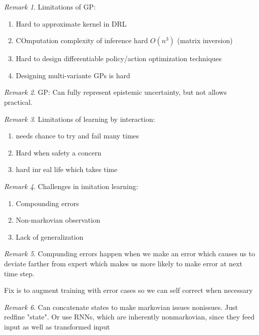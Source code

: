 \documentclass[11pt]{article}
\theoremstyle{remark}
\newtheorem{remark}{Remark}
\begin{document}
\begin{remark}
	Limitations of GP:
	\begin{enumerate}
		\item Hard to approximate kernel in DRL
		\item COmputation complexity of inference hard $O(n^3)$ (matrix inversion)
		\item Hard to design differentiable policy/action optimization techniques
		\item Designing multi-variante GPs is hard
	\end{enumerate}
\end{remark}

\begin{remark}
	GP: Can fully represent epistemic uncertainty, but not allows practical. 
\end{remark}

\begin{remark}
	Limitations of learning by interaction:
	\begin{enumerate}
		\item needs chance to try and fail many times
		\item Hard when safety a concern
		\item hard inr eal life which takes time
	\end{enumerate}
\end{remark}

\begin{remark}
	Challenges in imitation learning:
	\begin{enumerate}
		\item Compounding errors
		\item Non-markovian observation
		\item Lack of generalization
	\end{enumerate}
\end{remark}

\begin{remark}
	Compunding errors happen when we make an error which causes us to deviate farther from expert which makes us more likely to make error at next time step. 

	Fix is to augment training with error cases so we can self correct when necessary
\end{remark}

\begin{remark}
	Can concatenate states to make markovian issues nonissues. Just redfine "state". Or use RNNs, which are inherently nonmarkovian, since they feed input as well as transformed input
\end{remark}
\end{document}
